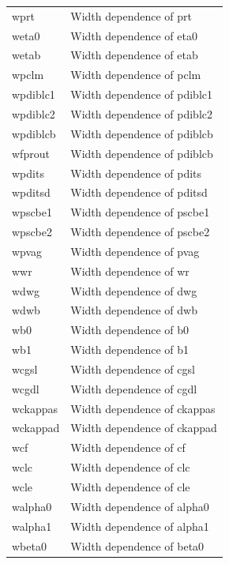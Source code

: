 \begin{longtable}{l l}
{\small wprt} & {\small Width dependence of prt} \\
{\small weta0} & {\small Width dependence of eta0} \\   
{\small wetab} & {\small Width dependence of etab} \\   
{\small wpclm} & {\small Width dependence of pclm} \\   
{\small wpdiblc1} & {\small Width dependence of pdiblc1} \\   
{\small wpdiblc2} & {\small Width dependence of pdiblc2} \\   
{\small wpdiblcb} & {\small Width dependence of pdiblcb} \\   
{\small wfprout} & {\small Width dependence of pdiblcb} \\
{\small wpdits} & {\small Width dependence of pdits} \\
{\small wpditsd} & {\small Width dependence of pditsd} \\
{\small wpscbe1} & {\small Width dependence of pscbe1} \\   
{\small wpscbe2} & {\small Width dependence of pscbe2} \\   
{\small wpvag} & {\small Width dependence of pvag} \\   
{\small wwr} & {\small Width dependence of wr} \\
{\small wdwg} & {\small Width dependence of dwg} \\
{\small wdwb} & {\small Width dependence of dwb} \\
{\small wb0} & {\small Width dependence of b0} \\
{\small wb1} & {\small Width dependence of b1} \\
{\small wcgsl} & {\small Width dependence of cgsl} \\
{\small wcgdl} & {\small Width dependence of cgdl} \\
{\small wckappas} & {\small Width dependence of ckappas} \\
{\small wckappad} & {\small Width dependence of ckappad} \\
{\small wcf} & {\small Width dependence of cf} \\
{\small wclc} & {\small Width dependence of clc} \\
{\small wcle} & {\small Width dependence of cle} \\
{\small walpha0} & {\small Width dependence of alpha0} \\
{\small walpha1} & {\small Width dependence of alpha1} \\
{\small wbeta0} & {\small Width dependence of beta0} \\


\end{longtable}

